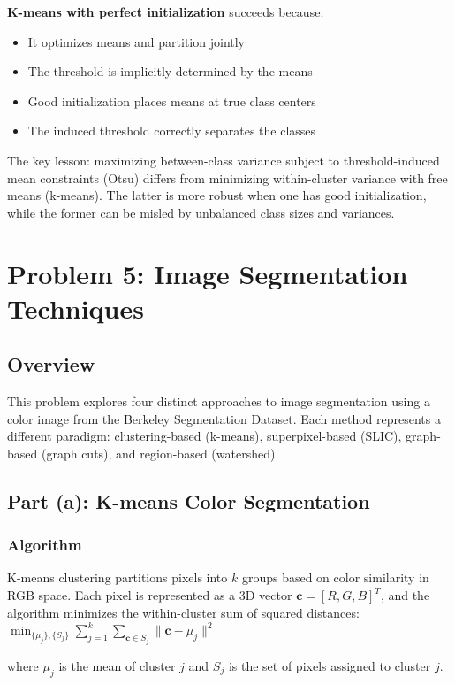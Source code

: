 \documentclass[11pt,a4paper]{article}
\begin{document}
\textbf{K-means with perfect initialization} succeeds because:
\begin{itemize}
    \item It optimizes means and partition jointly
    \item The threshold is implicitly determined by the means
    \item Good initialization places means at true class centers
    \item The induced threshold correctly separates the classes
\end{itemize}

The key lesson: maximizing between-class variance subject to threshold-induced mean constraints (Otsu) differs from minimizing within-cluster variance with free means (k-means). The latter is more robust when one has good initialization, while the former can be misled by unbalanced class sizes and variances.
\newpage
\section{Problem 5: Image Segmentation Techniques}

\subsection{Overview}
This problem explores four distinct approaches to image segmentation using a color image from the Berkeley Segmentation Dataset. Each method represents a different paradigm: clustering-based (k-means), superpixel-based (SLIC), graph-based (graph cuts), and region-based (watershed).

\subsection{Part (a): K-means Color Segmentation}

\subsubsection{Algorithm}
K-means clustering partitions pixels into $k$ groups based on color similarity in RGB space. Each pixel is represented as a 3D vector $\mathbf{c} = [R, G, B]^T$, and the algorithm minimizes the within-cluster sum of squared distances:
$\min_{\{\mu_j\}, \{S_j\}} \sum_{j=1}^k \sum_{\mathbf{c} \in S_j} \|\mathbf{c} - \mu_j\|^2$

where $\mu_j$ is the mean of cluster $j$ and $S_j$ is the set of pixels assigned to cluster $j$.
\end{document}
